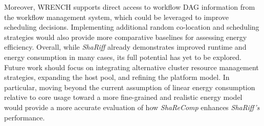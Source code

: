 Moreover, WRENCH supports direct access to workflow DAG information from the workflow management system, which could be leveraged to improve scheduling decisions. Implementing additional random co-location and scheduling strategies would also provide more comparative baselines for assessing energy efficiency.
Overall, while \textit{ShaRiff} already demonstrates improved runtime and energy consumption in many cases, its full potential has yet to be explored. Future work should focus on integrating alternative cluster resource management strategies, expanding the host pool, and refining the platform model. In particular, moving beyond the current assumption of linear energy consumption relative to core usage toward a more fine-grained and realistic energy model would provide a more accurate evaluation of how \textit{ShaReComp} enhances \textit{ShaRiff's} performance.
